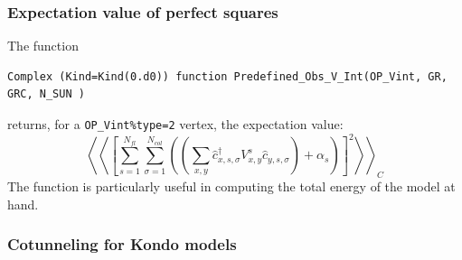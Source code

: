 \subsubsection{Expectation value of perfect  squares}
The  function
\begin{lstlisting}[style=fortran]
 Complex (Kind=Kind(0.d0)) function Predefined_Obs_V_Int(OP_Vint, GR, GRC, N_SUN )
\end{lstlisting}
returns,   for  a  \texttt{OP\_Vint\%type=2}      vertex,   the   expectation value: 
\begin{equation}
	\left< \left<     \left[  \sum_{s=1}^{N_{fl}} \sum_{\sigma=1}^{N_{col}}  \left(   \left(  \sum_{x,y} \hat{c}^{\dagger}_{x,s,\sigma}  V^{s}_{x,y} 
	 \hat{c}^{\phantom\dagger}_{y,s,\sigma} \right)     +  \alpha_s \right)  \right] ^2    \right>  \right>_C
\end{equation}
The   function is   particularly  useful  in computing  the    total  energy  of  the model  at hand. 

\subsubsection{Cotunneling for Kondo models}

